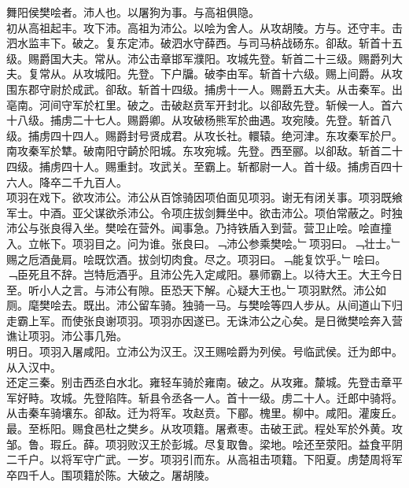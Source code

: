 \documentclass{zhvt-classic}
\begin{document}

\hspace*{2em}舞阳侯樊哙者。沛人也。以屠狗为事。与高祖俱隐。\\
\hspace*{2em}初从高祖起丰。攻下沛。高祖为沛公。以哙为舍人。从攻胡陵。方与。还守丰。击泗水监丰下。破之。复东定沛。破泗水守薛西。与司马枿战砀东。卻敌。斩首十五级。赐爵国大夫。常从。沛公击章邯军濮阳。攻城先登。斩首二十三级。赐爵列大夫。复常从。从攻城阳。先登。下户牖。破李由军。斩首十六级。赐上间爵。从攻围东郡守尉於成武。卻敌。斩首十四级。捕虏十一人。赐爵五大夫。从击秦军。出亳南。河间守军於杠里。破之。击破赵贲军开封北。以卻敌先登。斩候一人。首六十八级。捕虏二十七人。赐爵卿。从攻破杨熊军於曲遇。攻宛陵。先登。斩首八级。捕虏四十四人。赐爵封号贤成君。从攻长社。轘辕。绝河津。东攻秦军於尸。南攻秦军於犨。破南阳守齮於阳城。东攻宛城。先登。西至郦。以卻敌。斩首二十四级。捕虏四十人。赐重封。攻武关。至霸上。斩都尉一人。首十级。捕虏百四十六人。降卒二千九百人。\\
\hspace*{2em}项羽在戏下。欲攻沛公。沛公从百馀骑因项伯面见项羽。谢无有闭关事。项羽既飨军士。中酒。亚父谋欲杀沛公。令项庄拔剑舞坐中。欲击沛公。项伯常蔽之。时独沛公与张良得入坐。樊哙在营外。闻事急。乃持铁盾入到营。营卫止哙。哙直撞入。立帐下。项羽目之。问为谁。张良曰。﹁沛公参乘樊哙。﹂项羽曰。﹁壮士。﹂赐之卮酒彘肩。哙既饮酒。拔剑切肉食。尽之。项羽曰。﹁能复饮乎。﹂哙曰。﹁臣死且不辞。岂特卮酒乎。且沛公先入定咸阳。暴师霸上。以待大王。大王今日至。听小人之言。与沛公有隙。臣恐天下解。心疑大王也。﹂项羽默然。沛公如厕。麾樊哙去。既出。沛公留车骑。独骑一马。与樊哙等四人步从。从间道山下归走霸上军。而使张良谢项羽。项羽亦因遂已。无诛沛公之心矣。是日微樊哙奔入营谯让项羽。沛公事几殆。\\
\hspace*{2em}明日。项羽入屠咸阳。立沛公为汉王。汉王赐哙爵为列侯。号临武侯。迁为郎中。从入汉中。\\
\hspace*{2em}还定三秦。别击西丞白水北。雍轻车骑於雍南。破之。从攻雍。斄城。先登击章平军好畤。攻城。先登陷阵。斩县令丞各一人。首十一级。虏二十人。迁郎中骑将。从击秦车骑壤东。卻敌。迁为将军。攻赵贲。下郿。槐里。柳中。咸阳。灌废丘。最。至栎阳。赐食邑杜之樊乡。从攻项籍。屠煮枣。击破王武。程处军於外黄。攻邹。鲁。瑕丘。薛。项羽败汉王於彭城。尽复取鲁。梁地。哙还至荥阳。益食平阴二千户。以将军守广武。一岁。项羽引而东。从高祖击项籍。下阳夏。虏楚周将军卒四千人。围项籍於陈。大破之。屠胡陵。\\
\end{document}
